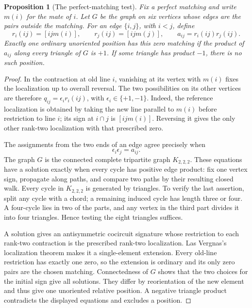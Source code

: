 \documentclass[11pt]{article}
\newtheorem{proposition}[theorem]{Proposition}
\theoremstyle{definition}\newtheorem{definition}[theorem]{Definition}
\begin{document}
\begin{proposition}[The perfect-matching test]\label{prop:matching}
Fix a perfect matching and write $m(i)$ for the mate of $i$.
Let $G$ be the graph on six vertices whose edges are the pairs outside
the matching. For an edge $\{i,j\}$, with $i<j$, define
\[
 r_i(ij)=[ijm(i)],\qquad r_j(ij)=[ijm(j)],\qquad
 a_{ij}=r_i(ij)r_j(ij).
\]
Exactly one ordinary unoriented position has this zero matching if
the product of $a_{ij}$ along every triangle of $G$ is $+1$.
If some triangle has product $-1$, there is no such position.
\end{proposition}
\begin{proof}
In the contraction at old line $i$, vanishing at its vertex with
$m(i)$ fixes the localization up to overall reversal. The two
possibilities on its other vertices are therefore
$q_{ij}=\epsilon_i r_i(ij)$, with $\epsilon_i\in\{+1,-1\}$.
Indeed, the reference localization is obtained by taking the new line
parallel to $m(i)$ before restriction to line $i$; its sign at
$i\cap j$ is $[ijm(i)]$. Reversing it gives the only other rank-two
localization with that prescribed zero.

The assignments from the two ends of an edge agree precisely when
\[
 \epsilon_i\epsilon_j=a_{ij}.
\]
The graph $G$ is the connected complete tripartite graph $K_{2,2,2}$.
These equations have a solution exactly when every cycle has positive
edge product: fix one vertex sign, propagate along paths, and compare
two paths by their resulting closed walk. Every cycle in $K_{2,2,2}$
is generated by triangles. To verify the last assertion, split any
cycle with a chord; a remaining induced cycle has length three or
four. A four-cycle lies in two of the parts, and any vertex in the
third part divides it into four triangles. Hence testing the eight
triangles suffices.

A solution gives an antisymmetric cocircuit signature whose
restriction to each rank-two contraction is the prescribed rank-two
localization. Las Vergnas's localization theorem
\cite[Theorem~4.1, pp.~33--34]{Bailey1997} makes it a single-element
extension. Every old-line restriction has exactly one zero, so the
extension is ordinary and its only zero pairs are the chosen matching.
Connectedness of $G$ shows that the two choices for the initial sign
give all solutions. They differ by reorientation of the new element
and thus give one unoriented relative position. A negative triangle
product contradicts the displayed equations and excludes a position.
\end{proof}
\end{document}
